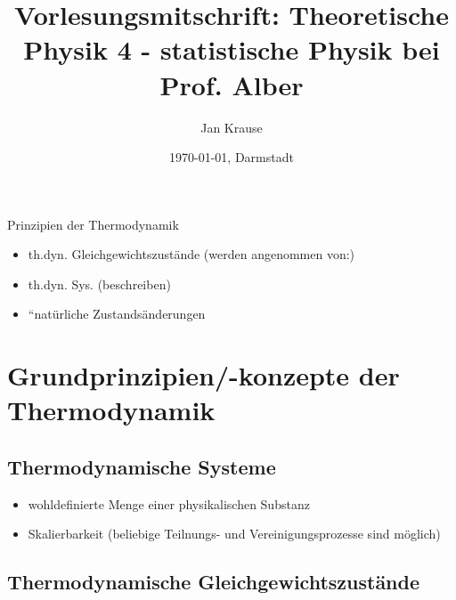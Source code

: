 \documentclass[10pt]{scrartcl} %
\title{Vorlesungsmitschrift: Theoretische Physik 4 - statistische Physik bei Prof. Alber}
\author{Jan Krause}
\date{\today{}, Darmstadt}
\begin{document}
\maketitle
\tableofcontents

 
 Prinzipien der Thermodynamik

 \begin{itemize}
  \item th.dyn. Gleichgewichtszustände (werden angenommen von:)
  \item th.dyn. Sys. (beschreiben)
  \item ``natürliche Zustandsänderungen
 \end{itemize}



 \section{Grundprinzipien/-konzepte der Thermodynamik}
 \label{sec:grundprinzipien}

 \subsection{Thermodynamische Systeme}
 \label{sec:grundprinzipien-thermodynamische-systeme}
 \begin{itemize}
  \item wohldefinierte Menge einer physikalischen Substanz
  \item Skalierbarkeit (beliebige Teilnungs- und Vereinigungsprozesse sind möglich)
 \end{itemize}
 
 \subsection{Thermodynamische Gleichgewichtszustände}
 \label{sec:grundprinzipien-thermodynmische-gleichgewichtszustaende}
 
 

  

 
 
 
 
 
 
 
 
 
 
 
 
 
 
 
 
 
 
 
 
 
 
 
 
\end{document}
